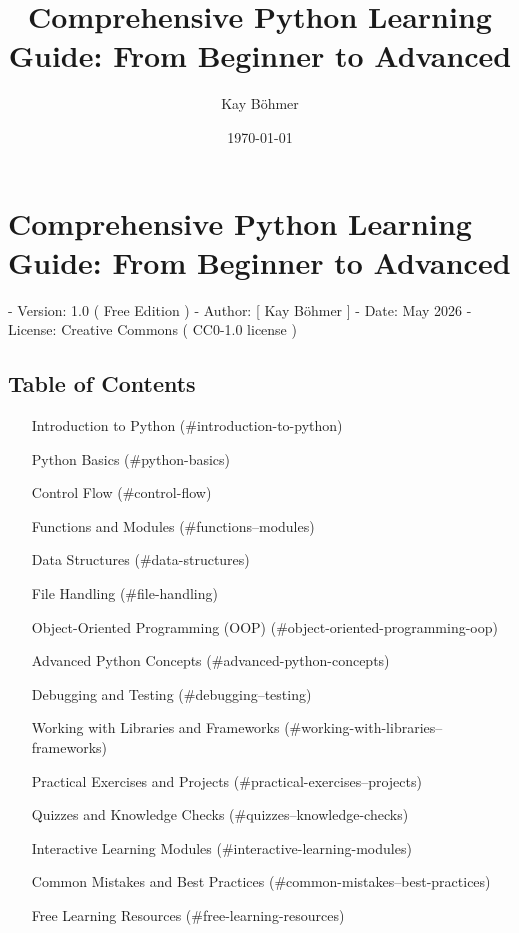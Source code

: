 \documentclass{article}
\title{Comprehensive Python Learning Guide: From Beginner to Advanced}
\author{Kay Böhmer}
\date{\today}
\begin{document}
\maketitle
\tableofcontents
\newpage

\section{Comprehensive Python Learning Guide: From Beginner to Advanced}

- Version: 1.0 ( Free Edition )
- Author: [ Kay Böhmer ]
- Date: May 2026
- License: Creative Commons ( CC0-1.0 license )

\subsection{Table of Contents}

\begin{itemize}
    \item [Introduction to Python](\#introduction-to-python)
    \item [Python Basics](\#python-basics)
    \item [Control Flow](\#control-flow)
    \item [Functions and Modules](\#functions--modules)
    \item [Data Structures](\#data-structures)
    \item [File Handling](\#file-handling)
    \item [Object-Oriented Programming (OOP)](\#object-oriented-programming-oop)
    \item [Advanced Python Concepts](\#advanced-python-concepts)
    \item [Debugging and Testing](\#debugging--testing)
    \item [Working with Libraries and Frameworks](\#working-with-libraries--frameworks)
    \item [Practical Exercises and Projects](\#practical-exercises--projects)
    \item [Quizzes and Knowledge Checks](\#quizzes--knowledge-checks)
    \item [Interactive Learning Modules](\#interactive-learning-modules)
    \item [Common Mistakes and Best Practices](\#common-mistakes--best-practices)
    \item [Free Learning Resources](\#free-learning-resources)
\end{itemize}
\end{document}
